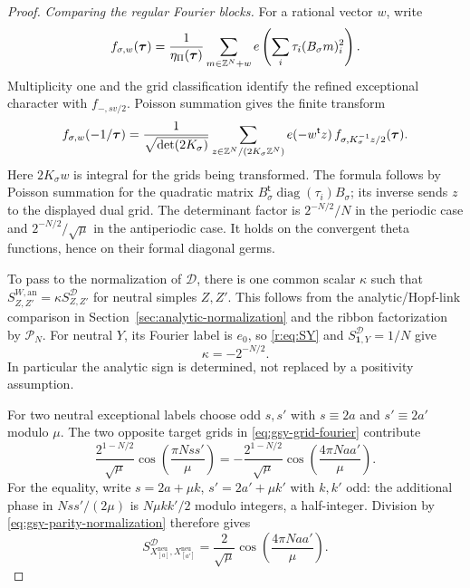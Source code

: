 \documentclass[11pt,a4paper]{article}
\numberwithin{equation}{section}
\theoremstyle{definition}\newtheorem{definition}[theorem]{Definition}
\theoremstyle{remark}\newtheorem{remark}[theorem]{Remark}
\newcommand{\one}{\mathbf1}\newcommand{\B}{\mathcal B}\newcommand{\W}{W_N}
\newcommand{\diag}{\operatorname{diag}}\renewcommand{\Vec}{\operatorname{Vec}}
\begin{document}
\begin{proof}
\emph{Comparing the regular Fourier blocks.}
For a rational vector $w$, write
\[
 f_{\sigma,w}(\boldsymbol\tau)
 =\frac1{\eta_\Pi(\boldsymbol\tau)}
   \sum_{m\in\mathbb Z^N+w}
       e\left(\sum_i\tau_i(B_\sigma m)_i^2\right).
\]
Multiplicity one and the grid classification identify the refined
exceptional character with $f_{-,sv/2}$. Poisson summation gives
the finite transform
\begin{equation}\label{eq:gsy-grid-fourier}
 f_{\sigma,w}(-1/\boldsymbol\tau)
 =\frac1{\sqrt{\det(2K_\sigma)}}
  \sum_{z\in\mathbb Z^N/(2K_\sigma\mathbb Z^N)}
    e(-w^{\mathsf t}z)\,
    f_{\sigma,K_\sigma^{-1}z/2}(\boldsymbol\tau).
\end{equation}
Here $2K_\sigma w$ is integral for the grids being transformed.
The formula follows by Poisson summation for the quadratic matrix
$B_\sigma^{\mathsf t}\diag(\tau_i)B_\sigma$; its inverse sends
$z$ to the displayed dual grid. The determinant factor is
$2^{-N/2}/N$ in the periodic case and
$2^{-N/2}/\sqrt\mu$ in the antiperiodic case.
It holds on the convergent theta functions, hence on their formal
diagonal germs.

To pass to the normalization of $\mathcal D$, there is one common
scalar $\kappa$ such that
$S^{W,\mathrm{an}}_{Z,Z'}=\kappa S^{\mathcal D}_{Z,Z'}$ for neutral
simples $Z,Z'$. This follows from the analytic/Hopf-link comparison
in Section~\ref{sec:analytic-normalization} and the ribbon
factorization by $\mathcal P_N$. For neutral $Y$, its Fourier label
is $e_0$, so \eqref{r:eq:SY} and $S^{\mathcal D}_{\one,Y}=1/N$ give
\begin{equation}\label{eq:gsy-parity-normalization}
                         \kappa=-2^{-N/2}.
\end{equation}
In particular the analytic sign is determined, not replaced by a
positivity assumption.

For two neutral exceptional labels choose odd $s,s'$ with
$s\equiv2a$ and $s'\equiv2a'$ modulo $\mu$. The two opposite
target grids in \eqref{eq:gsy-grid-fourier} contribute
\[
 \frac{2^{1-N/2}}{\sqrt\mu}
       \cos\left(\frac{\pi Nss'}\mu\right)
 =-\frac{2^{1-N/2}}{\sqrt\mu}
       \cos\left(\frac{4\pi Naa'}\mu\right).
\]
For the equality, write $s=2a+\mu k$, $s'=2a'+\mu k'$ with
$k,k'$ odd: the additional phase in $Nss'/(2\mu)$ is
$N\mu kk'/2$ modulo integers, a half-integer. Division by
\eqref{eq:gsy-parity-normalization} therefore gives
\begin{equation}\label{eq:gsy-natural-XX}
 S^{\mathcal D}_{X^{\mathrm{neu}}_{[a]},X^{\mathrm{neu}}_{[a']}}
   =\frac2{\sqrt\mu}\cos\left(\frac{4\pi Naa'}\mu\right).
\end{equation}


\end{proof}
\end{document}
